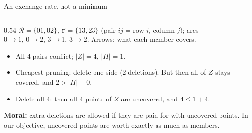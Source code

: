 \documentclass[aspectratio=169,11pt]{beamer}
\newcommand{\abs}[1]{\lvert #1\rvert}
\newcommand{\Rf}{\mathcal R}
\newcommand{\Cf}{\mathcal C}
\begin{document}
\begin{frame}{An exchange rate, not a minimum}
\begin{columns}[c]
\begin{column}{0.54\textwidth}
\small
$\Rf=\{01,02\}$, $\Cf=\{13,23\}$ (pair $ij$ = row $i$, column $j$); arcs $0\to1,\,0\to2,\,3\to1,\,3\to2$.
Arrows: what each member covers.
\begin{itemize}
\item All $4$ pairs conflict; $\abs Z=4$, $\abs H=1$.
\item Cheapest pruning: delete one side ($2$ deletions). But then all of $Z$
stays covered, and $2>\abs H+0$.
\item Delete all $4$: then all $4$ points of $Z$ are uncovered, and $4\le1+4$. \checkmark
\end{itemize}
\textbf{Moral:} extra deletions are allowed if they are paid for with
uncovered points. In our objective, uncovered points are worth exactly as
much as members.
\end{column}
\end{columns}
\end{frame}
\end{document}
